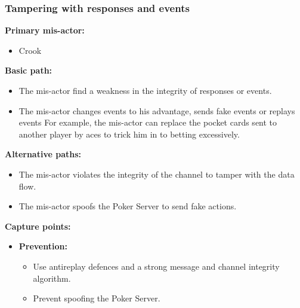 \documentclass[a4paper,11pt]{report}
\begin{document}
\subsubsection{Tampering with responses and events}
\textbf{Primary mis-actor:}
\begin{itemize}
\item Crook
\end{itemize}
\textbf{Basic path:}
\begin{itemize}
\item The mis-actor find a weakness in the integrity of responses or events.
\item The mis-actor changes events to his advantage, sends fake events or replays events For example, the mis-actor can replace the pocket cards sent to another player by aces to trick him in to betting excessively.
\end{itemize}
\textbf{Alternative paths:}
\begin{itemize}
\item The mis-actor violates the integrity of the channel to tamper with the data flow.
\item The mis-actor spoofs the Poker Server to send fake actions.
\end{itemize}
\textbf{Capture points:}
\begin{itemize}
\item \textbf{Prevention:}
\begin{itemize}
\item Use antireplay defences and a strong message and channel integrity algorithm.
\item Prevent spoofing the Poker Server.
\end{itemize}
\end{itemize}
\end{document}
